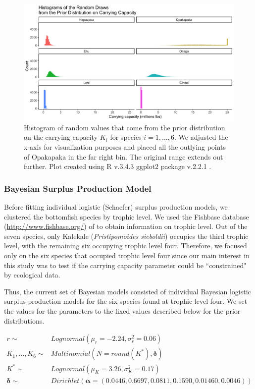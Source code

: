 \documentclass[oneside,12pt,final]{sty/ucthesis-CA2012}
\let\cite\citep                             %
\begin{document}
\begin{mainmatter}
\begin{figure}[H]
     \centering
       \includegraphics[width=.9\textwidth]{fig/hist_prior_K}
    \caption{Histogram of random values that come from the prior distribution on the carrying capacity $K_i$ for species $i=1,\dots,6$. We adjusted the x-axis for visualization purposes and placed all the outlying points of Opakapaka in the far right bin. The original range extends out further. Plot created using R v.3.4.3 \cite{Rcite} ggplot2 package v.2.2.1 \cite{ggplot}.}
    \label{priorK}
\end{figure}

\subsubsection{Bayesian Surplus Production Model}
Before fitting individual logistic (Schaefer) surplus production models, we clustered the bottomfish species by trophic level. We used the Fishbase database (\url{http://www.fishbase.org/}) of \citet{fishbase} to obtain information on trophic level. Out of the seven species, only Kalekale (\textit{Pristipomoides sieboldii}) occupies the third trophic level, with the remaining six occupying trophic level four. Therefore, we focused only on the six species that occupied trophic level four since our main interest in this study was to test if the carrying capacity parameter could be ``constrained" by ecological data. 

\vspace{5mm}

Thus, the current set of Bayesian models consisted of individual Bayesian logistic surplus production models for the six species found at trophic level four. We set the values for the parameters to the fixed values described below for the prior distributions.

\begin{align*}
r \sim & Lognormal(\mu_r = -2.24, \sigma_r^2 = 0.06) \\
K_1,\dots,K_6  \sim & Multinomial(N=round(K^*), \boldsymbol{\delta}) \\
K^*  \sim & Lognormal(\mu_K = 3.26, \sigma_K^2 = 0.17)  \\
\boldsymbol{\delta}  \sim & Dirichlet(\boldsymbol{\alpha}=(0.0446, 0.6697, 0.0811, 0.1590, 0.01460, 0.0046))
\end{align*}



\end{mainmatter}
\end{document}
